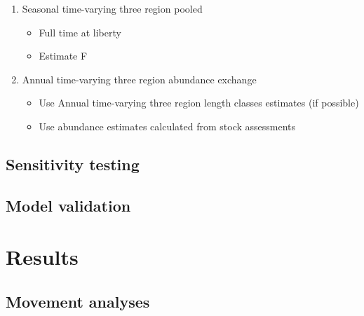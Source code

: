 \documentclass{article}
\begin{document}
\begin{enumerate}
    \item Seasonal time-varying three region pooled
    \begin{itemize}
        \item Full time at liberty
        \item Estimate F
    \end{itemize}
    \item Annual time-varying three region abundance exchange
    \begin{itemize}
        \item Use Annual time-varying three region length classes estimates (if possible)
        \item Use abundance estimates calculated from stock assessments
    \end{itemize}    
\end{enumerate}



\subsection{Sensitivity testing}

\subsection{Model validation}


\section{Results}

\subsection{Movement analyses}
\end{document}
